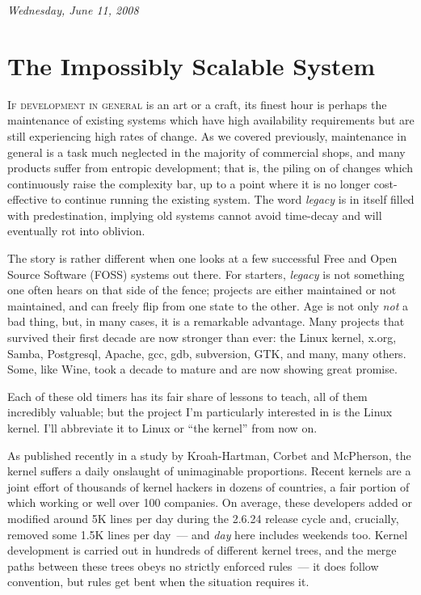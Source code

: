 \documentclass{book}
\begin{document}
\begin{flushright}
  \emph{Wednesday, June 11, 2008}
\end{flushright}


\section{The Impossibly Scalable System}

\lettrine{I}{f development in general} is an art or a craft, its
finest hour is perhaps the maintenance of existing systems which have
high availability requirements but are still experiencing high rates
of change. As we covered previously, maintenance in general is a task
much neglected in the majority of commercial shops, and many products
suffer from entropic development; that is, the piling on of changes
which continuously raise the complexity bar, up to a point where it is
no longer cost-effective to continue running the existing system. The
word \emph{legacy} is in itself filled with predestination, implying
old systems cannot avoid time-decay and will eventually rot into
oblivion.

The story is rather different when one looks at a few successful Free
and Open Source Software (FOSS) systems out there. For starters,
\emph{legacy} is not something one often hears on that side of the
fence; projects are either maintained or not maintained, and can
freely flip from one state to the other. Age is not only \emph{not} a
bad thing, but, in many cases, it is a remarkable advantage. Many
projects that survived their first decade are now stronger than ever:
the Linux kernel, x.org, Samba, Postgresql, Apache, gcc, gdb,
subversion, GTK, and many, many others. Some, like Wine, took a decade
to mature and are now showing great promise.

Each of these old timers has its fair share of lessons to teach, all
of them incredibly valuable; but the project I'm particularly
interested in is the Linux kernel. I'll abbreviate it to Linux or ``the
kernel'' from now on.

As published recently in a study by Kroah-Hartman, Corbet and
McPherson, the kernel suffers a daily onslaught of unimaginable
proportions. Recent kernels are a joint effort of thousands of kernel
hackers in dozens of countries, a fair portion of which working or
well over 100 companies. On average, these developers added or
modified around 5K lines per day during the 2.6.24 release cycle and,
crucially, removed some 1.5K lines per day~--- and \emph{day} here
includes weekends too. Kernel development is carried out in hundreds
of different kernel trees, and the merge paths between these trees
obeys no strictly enforced rules~--- it does follow convention, but
rules get bent when the situation requires it.
\end{document}
